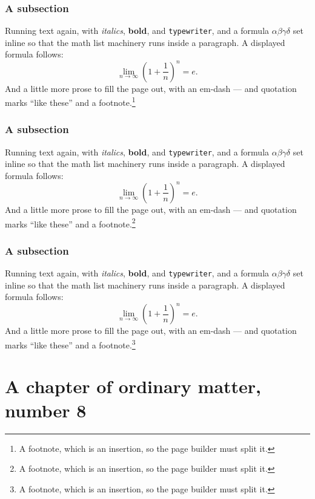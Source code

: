 \documentclass[11pt,a4paper]{report}
\theoremstyle{plain}
\begin{document}
\subsection{A subsection}
Running text again, with \textit{italics}, \textbf{bold}, and
\texttt{typewriter}, and a formula $\alpha\beta\gamma\delta$ set inline so
that the math list machinery runs inside a paragraph. A displayed formula
follows:
\[ \lim_{n\to\infty}\left(1+\frac{1}{n}\right)^{n}=e . \]
And a little more prose to fill the page out, with an em-dash --- and
quotation marks ``like these'' and a footnote.\footnote{A footnote, which is
an insertion, so the page builder must split it.}
\subsection{A subsection}
Running text again, with \textit{italics}, \textbf{bold}, and
\texttt{typewriter}, and a formula $\alpha\beta\gamma\delta$ set inline so
that the math list machinery runs inside a paragraph. A displayed formula
follows:
\[ \lim_{n\to\infty}\left(1+\frac{1}{n}\right)^{n}=e . \]
And a little more prose to fill the page out, with an em-dash --- and
quotation marks ``like these'' and a footnote.\footnote{A footnote, which is
an insertion, so the page builder must split it.}
\subsection{A subsection}
Running text again, with \textit{italics}, \textbf{bold}, and
\texttt{typewriter}, and a formula $\alpha\beta\gamma\delta$ set inline so
that the math list machinery runs inside a paragraph. A displayed formula
follows:
\[ \lim_{n\to\infty}\left(1+\frac{1}{n}\right)^{n}=e . \]
And a little more prose to fill the page out, with an em-dash --- and
quotation marks ``like these'' and a footnote.\footnote{A footnote, which is
an insertion, so the page builder must split it.}
\chapter{A chapter of ordinary matter, number 8}
\end{document}
